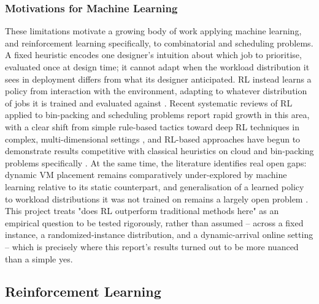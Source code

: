 \documentclass[12pt]{article}
\begin{document}
\subsubsection{Motivations for Machine Learning}
These limitations motivate a growing body of work applying machine learning, and reinforcement learning specifically, to combinatorial and scheduling problems. A fixed heuristic encodes one designer's intuition about which job to prioritise, evaluated once at design time; it cannot adapt when the workload distribution it sees in deployment differs from what its designer anticipated. RL instead learns a policy from interaction with the environment, adapting to whatever distribution of jobs it is trained and evaluated against \cite{ml_ra_litrev2025}. Recent systematic reviews of RL applied to bin-packing and scheduling problems report rapid growth in this area, with a clear shift from simple rule-based tactics toward deep RL techniques in complex, multi-dimensional settings \cite{DAHMANI2025100616}, and RL-based approaches have begun to demonstrate results competitive with classical heuristics on cloud and bin-packing problems specifically \cite{10854610, hu2021attend2pack}. At the same time, the literature identifies real open gaps: dynamic VM placement remains comparatively under-explored by machine learning relative to its static counterpart, and generalisation of a learned policy to workload distributions it was not trained on remains a largely open problem \cite{ml_ra_litrev2025, DAHMANI2025100616}. This project treats "does RL outperform traditional methods here" as an empirical question to be tested rigorously, rather than assumed -- across a fixed instance, a randomized-instance distribution, and a dynamic-arrival online setting -- which is precisely where this report's results turned out to be more nuanced than a simple yes.

\subsection{Reinforcement Learning}
\end{document}
